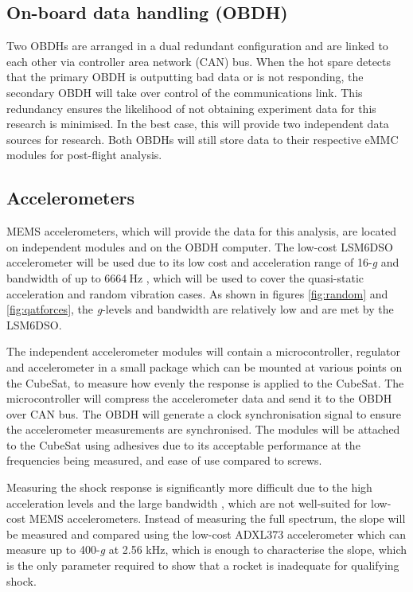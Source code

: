 \documentclass[a4paper,11pt]{article}
\begin{document}
\subsection{On-board data handling (OBDH)}
Two OBDHs are arranged in a dual redundant configuration and are linked to each other via controller area network (CAN) bus. When the hot spare detects that the primary OBDH is outputting bad data or is not responding, the secondary OBDH will take over control of the communications link. This redundancy ensures the likelihood of not obtaining experiment data for this research is minimised. In the best case, this will provide two independent data sources for research. Both OBDHs will still store data to their respective eMMC modules for post-flight analysis.

\subsection{Accelerometers}
MEMS accelerometers, which will provide the data for this analysis, are located on independent modules and on the OBDH computer. The low-cost LSM6DSO accelerometer will be used due to its low cost and acceleration range of 16-\textit{g} and bandwidth of up to $\SI{6664}{\hertz}$ \cite{lsm6dso-datasheet}, which will be used to cover the quasi-static acceleration and random vibration cases. As shown in figures \ref{fig:random} and \ref{fig:qatforces}, the \textit{g}-levels and bandwidth are relatively low and are met by the LSM6DSO.

The independent accelerometer modules will contain a microcontroller, regulator and accelerometer in a small package which can be mounted at various points on the CubeSat, to measure how evenly the response is applied to the CubeSat. The microcontroller will compress the accelerometer data and send it to the OBDH over CAN bus. The OBDH will generate a clock synchronisation signal to ensure the accelerometer measurements are synchronised. The modules will be attached to the CubeSat using adhesives due to its acceptable performance at the frequencies being measured, and ease of use compared to screws.

Measuring the shock response is significantly more difficult due to the high acceleration levels and the large bandwidth \cite{nasa-pyroshock}, which are not well-suited for low-cost MEMS accelerometers. Instead of measuring the full spectrum, the slope will be measured and compared using the low-cost ADXL373 accelerometer which can measure up to 400-\textit{g} at 2.56 kHz, which is enough to characterise the slope, which is the only parameter required to show that a rocket is inadequate for qualifying shock.
\end{document}
